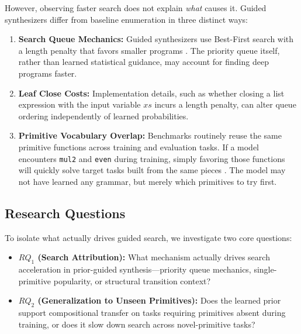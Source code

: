 \documentclass[10pt,twocolumn]{article}
\begin{document}
However, observing faster search does not explain \textit{what} causes it. Guided synthesizers differ from baseline enumeration in three distinct ways:
\begin{enumerate}[leftmargin=1.2em, itemsep=0.5pt, parsep=0pt]
    \item \textbf{Search Queue Mechanics:} Guided synthesizers use Best-First search with a length penalty that favors smaller programs \cite{lee2018accelerating}. The priority queue itself, rather than learned statistical guidance, may account for finding deep programs faster.
    \item \textbf{Leaf Close Costs:} Implementation details, such as whether closing a list expression with the input variable $xs$ incurs a length penalty, can alter queue ordering independently of learned probabilities.
    \item \textbf{Primitive Vocabulary Overlap:} Benchmarks routinely reuse the same primitive functions across training and evaluation tasks. If a model encounters \texttt{mul2} and \texttt{even} during training, simply favoring those functions will quickly solve target tasks built from the same pieces \cite{geirhos2020shortcut, arpit2017closer}. The model may not have learned any grammar, but merely which primitives to try first.
\end{enumerate}

\subsection{Research Questions}
To isolate what actually drives guided search, we investigate two core questions:
\begin{itemize}[leftmargin=1.2em, itemsep=0.5pt, parsep=0pt]
    \item \textbf{\texorpdfstring{$RQ_1$}{RQ1} (Search Attribution):} What mechanism actually drives search acceleration in prior-guided synthesis---priority queue mechanics, single-primitive popularity, or structural transition context?
    \item \textbf{\texorpdfstring{$RQ_2$}{RQ2} (Generalization to Unseen Primitives):} Does the learned prior support compositional transfer on tasks requiring primitives absent during training, or does it slow down search across novel-primitive tasks?
\end{itemize}
\end{document}
